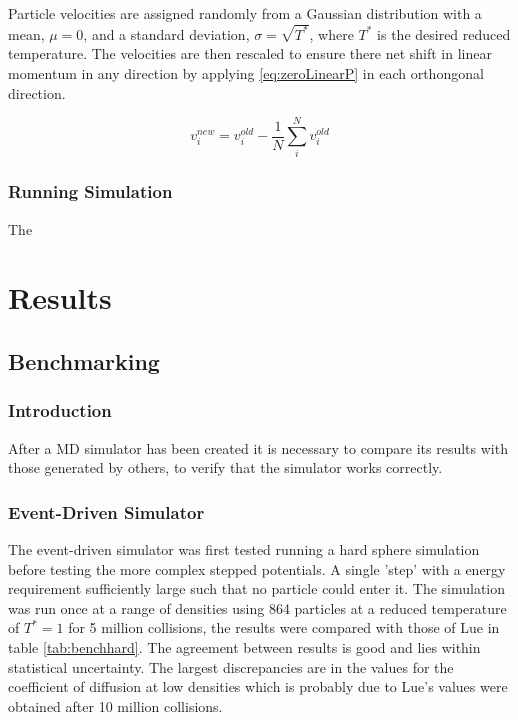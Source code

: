 \documentclass[12pt]{UoAthesis}
\begin{document}
Particle velocities are assigned randomly from a Gaussian distribution
with a mean, $\mu = 0$, and a standard deviation, $\sigma =
\sqrt{T^{*}}$, where $T^{*}$ is the desired reduced temperature. The
velocities are then rescaled to ensure there net shift in linear
momentum in any direction by applying \eqref{eq:zeroLinearP} in each
orthongonal direction.

\begin{equation} 
  v_{i}^{new} = v_{i}^{old} - \frac{1}{N}
  \sum^{N}_{i}v_{i}^{old}
  \label{eq:zeroLinearP} 
\end{equation}

\subsection{Running Simulation} 
The

\chapter{Results} 
\section{Benchmarking} 
\subsection{Introduction} 
After a MD simulator has been created it is necessary to compare its
results with those generated by others, to verify that the simulator
works correctly.

\subsection{Event-Driven Simulator}
 The event-driven simulator was first tested running a hard sphere
 simulation before testing the more complex stepped potentials. A
 single 'step' with a energy requirement sufficiently large such that
 no particle could enter it. The simulation was run once at a range of
 densities using 864 particles at a reduced temperature of $T^*=1$ for
 5 million collisions, the results were compared with those of Lue
 \cite{Lue2005} in table \ref{tab:benchhard}. The agreement between
 results is good and lies within statistical uncertainty. The largest
 discrepancies are in the values for the coefficient of diffusion at
 low densities which is probably due to Lue's values were obtained
 after 10 million collisions.
\end{document}
